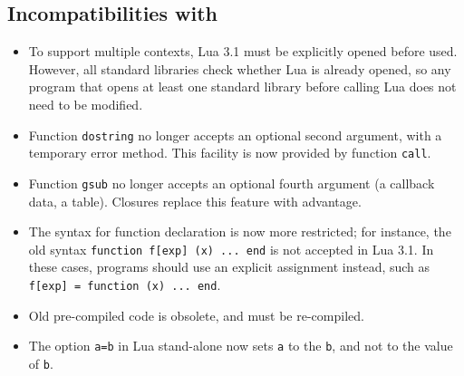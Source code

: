 \subsection*{Incompatibilities with }
\begin{itemize}

\item To support multiple contexts,
Lua 3.1 must be explicitly opened before used.
However, all standard libraries check whether Lua is already opened,
so any program that opens at least one standard library before calling
Lua does not need to be modified.

\item Function \verb|dostring| no longer accepts an optional second argument,
with a temporary error method.
This facility is now provided by function \verb|call|.

\item Function \verb|gsub| no longer accepts an optional fourth argument
(a callback data, a table).
Closures replace this feature with advantage.

\item The syntax for function declaration is now more restricted;
for instance, the old syntax \verb|function f[exp] (x) ... end| is not
accepted in Lua 3.1.
In these cases,
programs should use an explicit assignment instead, such as
\verb|f[exp] = function (x) ... end|.

\item Old pre-compiled code is obsolete, and must be re-compiled.

\item The option \verb|a=b| in Lua stand-alone now sets \verb|a| to the
 \verb|b|, and not to the value of \verb|b|.

\end{itemize}

\newcommand{\indexentry}[2]{\item {#1} #2}
\begin{theindex}

\end{theindex}





